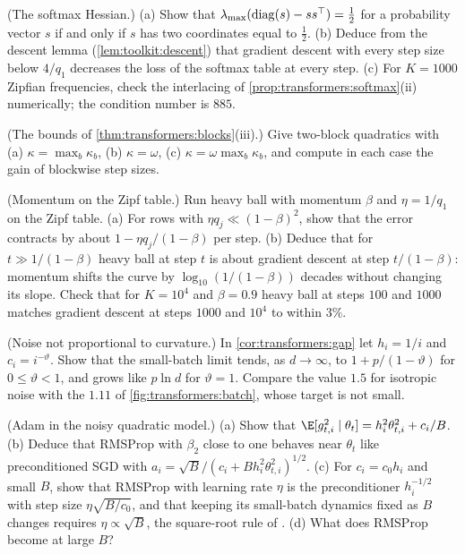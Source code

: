 \begin{refsection}
\begin{exercises}
\item \consolidation (The softmax Hessian.) (a) Show that $\lambda_{\max}(\operatorname{diag}(s)-ss^\top)=\frac12$ for a probability vector $s$ if and only if $s$ has two coordinates equal to $\frac12$. (b) Deduce from the descent lemma (\cref{lem:toolkit:descent}) that gradient descent with every step size below $4/q_1$ decreases the loss of the softmax table at every step. (c) For $K=1000$ Zipfian frequencies, check the interlacing of \cref{prop:transformers:softmax}(ii) numerically; the condition number is $885$.\label{ex:transformers:softmax}

\item \consolidation (The bounds of \cref{thm:transformers:blocks}(iii).) Give two-block quadratics with (a) $\kappa=\max_b\kappa_b$, (b) $\kappa=\omega$, (c) $\kappa=\omega\max_b\kappa_b$, and compute in each case the gain of blockwise step sizes.\label{ex:transformers:bounds}

\item \variation (Momentum on the Zipf table.) Run heavy ball with momentum $\beta$ and $\eta=1/q_1$ on the Zipf table. (a) For rows with $\eta q_j\ll(1-\beta)^2$, show that the error contracts by about $1-\eta q_j/(1-\beta)$ per step. (b) Deduce that for $t\gg1/(1-\beta)$ heavy ball at step $t$ is about gradient descent at step $t/(1-\beta)$: momentum shifts the curve by $\log_{10}(1/(1-\beta))$ decades without changing its slope. Check that for $K=10^4$ and $\beta=0.9$ heavy ball at steps $100$ and $1000$ matches gradient descent at steps $1000$ and $10^4$ to within $3\%$.\label{ex:transformers:momentum}

\item \variation (Noise not proportional to curvature.) In \cref{cor:transformers:gap} let $h_i=1/i$ and $c_i=i^{-\vartheta}$. Show that the small-batch limit tends, as $d\to\infty$, to $1+p/(1-\vartheta)$ for $0\le\vartheta<1$, and grows like $p\ln d$ for $\vartheta=1$. Compare the value $1.5$ for isotropic noise with the $1.11$ of \cref{fig:transformers:batch}, whose target is not small.\label{ex:transformers:noise}

\item \variation (Adam in the noisy quadratic model.) (a) Show that $\E[g_{t,i}^2\mid\theta_t]=h_i^2\theta_{t,i}^2+c_i/B$. (b) Deduce that RMSProp with $\beta_2$ close to one behaves near $\theta_t$ like preconditioned SGD with $a_i=\sqrt B/(c_i+Bh_i^2\theta_{t,i}^2)^{1/2}$. (c) For $c_i=c_0h_i$ and small $B$, show that RMSProp with learning rate $\eta$ is the preconditioner $h_i^{-1/2}$ with step size $\eta\sqrt{B/c_0}$, and that keeping its small-batch dynamics fixed as $B$ changes requires $\eta\propto\sqrt B$, the square-root rule of \textcite{MalladiEtAl2022}. (d) What does RMSProp become at large $B$?\label{ex:transformers:adamnqm}


\end{exercises}
\end{refsection}
